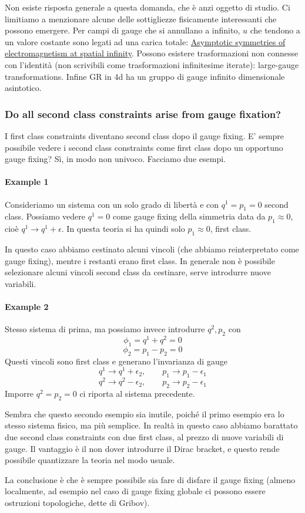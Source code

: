 \documentclass[a4paper, 11pt]{article}
\begin{document}
	Non esiste risposta generale a questa domanda, che è anzi oggetto di studio. Ci limitiamo a menzionare alcune delle sottigliezze fisicamente interessanti che possono emergere. Per campi di gauge che si annullano a infinito, $u$ che tendono a un valore costante sono legati ad una carica totale: \href{https://arxiv.org/pdf/1803.10194.pdf}{Asymptotic symmetries of electromagnetism at spatial infinity}.
	Possono esistere trasformazioni non connesse con l'identità (non scrivibili come trasformazioni infinitesime iterate): large-gauge transformations. Infine GR in 4d ha un gruppo di gauge infinito dimensionale asintotico.
	
	\subsubsection{Do all second class constraints arise from gauge fixation?}
	I first class constraints diventano second class dopo il gauge fixing. E' sempre possibile vedere i second class constraints come first class dopo un opportuno gauge fixing? Sì, in modo non univoco. Facciamo due esempi.
	\paragraph{Example 1} Consideriamo un sistema con un solo grado di libertà e con $q^1=p_1=0$ second class. Possiamo vedere $q^1=0$ come gauge fixing della simmetria data da $p_1\approx 0$, cioè $q^1\rightarrow q^1 + \epsilon$. In questa teoria si ha quindi solo $p_1\approx 0$, first class.
	
	In questo caso abbiamo cestinato alcuni vincoli (che abbiamo reinterpretato come gauge fixing), mentre i restanti erano first class. In generale non è possibile selezionare alcuni vincoli second class da cestinare, serve introdurre nuove variabili.
	\paragraph{Example 2} Stesso sistema di prima, ma possiamo invece introdurre $q^2,p_2$ con
	\[ \phi_1 = q^1+q^2 = 0 \]
	\[ \phi_2 = p_1-p_2 = 0 \]
	Questi vincoli sono first class e generano l'invarianza di gauge
	\[ q^1 \rightarrow q^1 + \epsilon_2,\qquad p_1 \rightarrow p_1 - \epsilon_1 \]
	\[ q^2 \rightarrow q^2 - \epsilon_2,\qquad p_2 \rightarrow p_2 - \epsilon_1 \]
	Imporre $q^2=p_2=0$ ci riporta al sistema precedente.
	
	Sembra che questo secondo esempio sia inutile, poiché il primo esempio era lo stesso sistema fisico, ma più semplice. In realtà in questo caso abbiamo barattato due second class constraints con due first class, al prezzo di nuove variabili di gauge. Il vantaggio è il non dover introdurre il Dirac bracket, e questo rende possibile quantizzare la teoria nel modo usuale.
	
	La conclusione è che è sempre possibile sia fare di disfare il gauge fixing (almeno localmente, ad esempio nel caso di gauge fixing globale ci possono essere ostruzioni topologiche, dette di Gribov).
	
	
	
	\newpage
	
\end{document}
